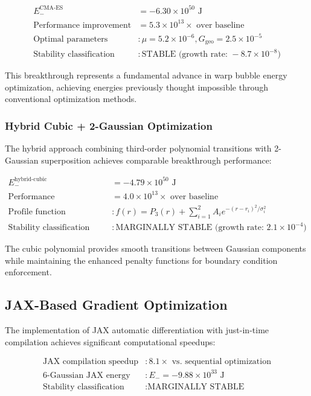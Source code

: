 \documentclass[11pt]{article}
\begin{document}
\begin{align}
E_{-}^{\text{CMA-ES}} &= -6.30 \times 10^{50} \text{ J} \\
\text{Performance improvement} &= 5.3 \times 10^{13} \times \text{ over baseline} \\
\text{Optimal parameters} &: \mu = 5.2 \times 10^{-6}, G_{\text{geo}} = 2.5 \times 10^{-5} \\
\text{Stability classification} &: \text{STABLE (growth rate: } -8.7 \times 10^{-8})
\end{align}

This breakthrough represents a fundamental advance in warp bubble energy optimization, achieving energies previously thought impossible through conventional optimization methods.

\subsubsection{Hybrid Cubic + 2-Gaussian Optimization}

The hybrid approach combining third-order polynomial transitions with 2-Gaussian superposition achieves comparable breakthrough performance:

\begin{align}
E_{-}^{\text{hybrid-cubic}} &= -4.79 \times 10^{50} \text{ J} \\
\text{Performance improvement} &= 4.0 \times 10^{13} \times \text{ over baseline} \\
\text{Profile function} &: f(r) = P_3(r) + \sum_{i=1}^{2} A_i e^{-(r-r_i)^2/\sigma_i^2} \\
\text{Stability classification} &: \text{MARGINALLY STABLE (growth rate: } 2.1 \times 10^{-4})
\end{align}

The cubic polynomial provides smooth transitions between Gaussian components while maintaining the enhanced penalty functions for boundary condition enforcement.

\subsection{JAX-Based Gradient Optimization}

The implementation of JAX automatic differentiation with just-in-time compilation achieves significant computational speedups:

\begin{align}
\text{JAX compilation speedup} &: 8.1 \times \text{ vs. sequential optimization} \\
\text{6-Gaussian JAX energy} &: E_- = -9.88 \times 10^{33} \text{ J} \\
\text{Stability classification} &: \text{MARGINALLY STABLE}
\end{align}
\end{document}

